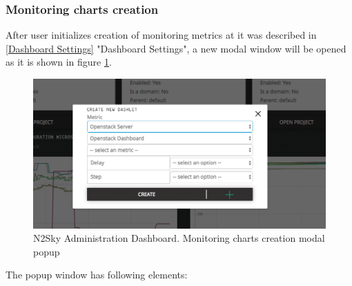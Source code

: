 \subsubsection{Monitoring charts creation}\label{Monitoring charts creation}

After user initializes creation of monitoring metrics at it was described in \autoref{Dashboard Settings} "Dashboard Settings", a new modal window will be opened as it is shown in figure \ref{fig:create_monitoring}.

\begin{figure}[H]
\begin{center}
  \includegraphics[width=\linewidth]{components/4/pics/create_monitoring.png}
  \caption{N2Sky Administration Dashboard. Monitoring charts creation modal popup}
  \label{fig:create_monitoring}
\end{center}
\end{figure}

The popup window has following elements:

